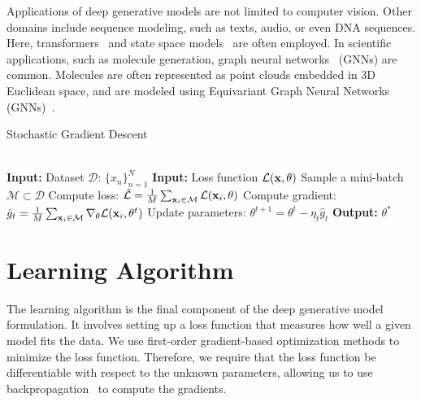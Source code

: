 Applications of deep generative models are not limited to computer vision. Other domains include sequence modeling, such as texts, audio, or even DNA sequences. Here, transformers~\citep{vaswani2017attention, hoffmann2022empirical} and state space models~\citep{gu2021combining, nguyen2024hyenadna} are often employed. 
In scientific applications, such as molecule generation, graph neural networks~\citep{bruna2013spectral, kipf2016semi} (GNNs) are common. Molecules are often represented as point clouds embedded in 3D Euclidean space, and are modeled using Equivariant Graph Neural Networks (GNNs)~\citep{kohler2020equivariant, satorras2021n}. 

\begin{algorithm}[t]
	\caption{Stochastic Gradient Descent}
	\label{alg:sgd_train}
	\begin{algorithmic}
  \\\hrulefill
\State \hskip-3mm  {\bfseries Input:} { Dataset $\mathcal{D}: \,\{x_n\}_{n=1}^N$}
\State \hskip-3mm  {\bfseries Input:} { Loss function $\mathcal{L}({\mathbf{x}}, \theta)$}
            \State Sample a mini-batch $\mathcal{M} \subset \mathcal{D}$
            \State Compute loss: $ \tilde{\mathcal{L}} = \frac1M \sum_{{\mathbf{x}}_i \in \mathcal{M}} \mathcal{L}({\mathbf{x}}_i, \theta)$
		\State Compute gradient: $\hat{g}_t = \frac1M \sum_{{\mathbf{x}}_i \in \mathcal{M}} \nabla_{\theta} \mathcal{L}({\mathbf{x}}_i, \theta^t)$
		\State Update parameters: $\theta^{t+1} = \theta^{t} - \eta_t \hat{g}_t $
		\EndWhile
            \State \hskip-3mm  {\bfseries Output:} $\theta^*$
	\end{algorithmic}
\end{algorithm}
\section{Learning Algorithm}\label{sec:intro_learning_algo}
The learning algorithm is the final component of the deep generative model formulation. 
It involves setting up a loss function that measures how well a given model fits the data.
We use first-order gradient-based optimization methods to minimize the loss function. 
Therefore, we require that the loss function be differentiable with respect to the unknown parameters, allowing us to use backpropagation~\citep{rumelhart1986learning} to compute the gradients.

